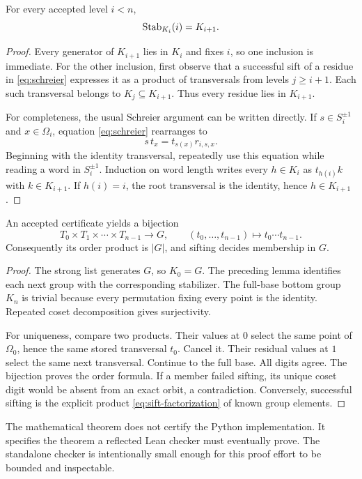 \begin{lemma}
For every accepted level $i<n$,
\[
  \operatorname{Stab}_{K_i}(i)=K_{i+1}.
\]
\end{lemma}
\begin{proof}
Every generator of $K_{i+1}$ lies in $K_i$ and fixes $i$, so one inclusion is immediate. For the other inclusion, first observe that a successful sift of a residue in \eqref{eq:schreier} expresses it as a product of transversals from levels $j\geq i+1$. Each such transversal belongs to $K_j\subseteq K_{i+1}$. Thus every residue lies in $K_{i+1}$.

For completeness, the usual Schreier argument can be written directly. If $s\in S_i^{\pm1}$ and $x\in\Omega_i$, equation \eqref{eq:schreier} rearranges to
\[
 s\,t_x=t_{s(x)}r_{i,s,x}.
\]
Beginning with the identity transversal, repeatedly use this equation while reading a word in $S_i^{\pm1}$. Induction on word length writes every $h\in K_i$ as $t_{h(i)}k$ with $k\in K_{i+1}$. If $h(i)=i$, the root transversal is the identity, hence $h\in K_{i+1}$.
\end{proof}

\begin{theorem}
\label{thm:chain}
An accepted certificate yields a bijection
\[
 T_0\times T_1\times\cdots\times T_{n-1}\longrightarrow G,
 \qquad (t_0,\ldots,t_{n-1})\longmapsto t_0\cdots t_{n-1}.
\]
Consequently its order product is $|G|$, and sifting decides membership in $G$.
\end{theorem}
\begin{proof}
The strong list generates $G$, so $K_0=G$. The preceding lemma identifies each next group with the corresponding stabilizer. The full-base bottom group $K_n$ is trivial because every permutation fixing every point is the identity. Repeated coset decomposition gives surjectivity.

For uniqueness, compare two products. Their values at $0$ select the same point of $\Omega_0$, hence the same stored transversal $t_0$. Cancel it. Their residual values at $1$ select the same next transversal. Continue to the full base. All digits agree. The bijection proves the order formula. If a member failed sifting, its unique coset digit would be absent from an exact orbit, a contradiction. Conversely, successful sifting is the explicit product \eqref{eq:sift-factorization} of known group elements.
\end{proof}

The mathematical theorem does not certify the Python implementation. It specifies the theorem a reflected Lean checker must eventually prove. The standalone checker is intentionally small enough for this proof effort to be bounded and inspectable.

